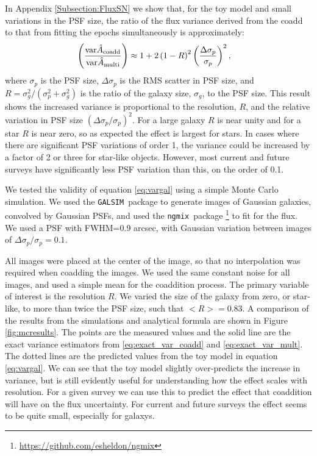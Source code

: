 \documentclass[fleqn,useAMS,usenatbib]{mnras}
\newcommand{\galsim}{\texttt{GALSIM}}
\newcommand{\ngmix}{\texttt{ngmix}}
\newcommand{\coadd}{{\rm coadd}}
\begin{document}
In Appendix \ref{Subsection:FluxSN} we show that, for the toy model and small
variations in the PSF size, the ratio of the flux variance derived from the
coadd to that from fitting the epochs simultaneously is approximately:
\begin{align} \label{eq:vargal}
\left( \frac{ {\rm var} \hat{A}_\coadd}{{\rm var} \hat{A}_{\rm multi} } 
\right) &
\approx 1 + 2 \left( 1 - R \right)^2 \left( \frac{\Delta 
\sigma_p}{\sigma_p} \right)^2,
\end{align}
where $\sigma_p$ is the PSF size, $\Delta \sigma_p$ is the RMS scatter in PSF
size, and $R=\sigma_g^2/(\sigma_p^2 + \sigma_g^2)$ is the ratio of the galaxy
size, $\sigma_g$, to the PSF size.  This result shows the increased variance is
proportional to the resolution, $R$, and the relative variation in PSF size
$(\Delta \sigma_p/\sigma_p)^2$.  For a large galaxy $R$ is near unity and for a star
$R$ is near zero, so as expected the effect is largest for stars.  In cases where there
are significant PSF variations of order 1, the variance could be increased by a
factor of 2 or three for star-like objects.  However, most current and future
surveys have significantly less PSF variation than this, on the order of 0.1.

We tested the validity of equation \ref{eq:vargal} using a simple Monte Carlo
simulation.  We used the \galsim\ package \citep{GalSim} to generate images of Gaussian
galaxies, convolved by Gaussian PSFs, and used the \ngmix\ package
\footnote{\url{https://github.com/esheldon/ngmix}} to fit for the flux. We used
a PSF with FWHM=0.9 arcsec, with Gaussian variation between images of $\Delta
\sigma_p/\sigma_p = 0.1$.

All images were placed at the center of the image, so that no interpolation was 
required when coadding the images.  We used the same constant noise for all 
images, and used a simple mean for the coaddition process.  The primary 
variable of interest is the resolution $R$.  We varied the size of the galaxy 
from zero, or star-like, to more than twice the PSF size, such that $<R> = 
0.83$.  A comparison of the results from the simulations and analytical formula 
are shown in Figure \ref{fig:mcresults}.  The points are the measured values 
and the solid line are the exact variance estimators from 
\ref{eq:exact_var_coadd} and \ref{eq:exact_var_mult}.  The dotted lines are the 
predicted values from the toy model in equation \ref{eq:vargal}.  We can 
see that the toy model slightly over-predicts the increase in variance, but is 
still evidently useful for understanding how the effect scales with resolution. 
For a given survey we can use this to predict the effect that coaddition will 
have on the flux uncertainty.  For current and future surveys the effect seems 
to be quite small, especially for galaxys.
\end{document}
